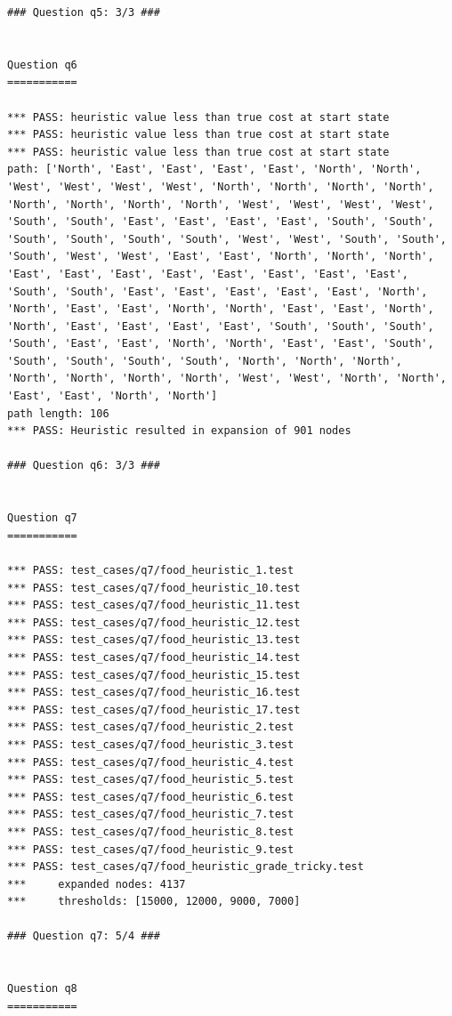 \documentclass{report}
\begin{document}
\begin{lstlisting}
### Question q5: 3/3 ###


Question q6
===========

*** PASS: heuristic value less than true cost at start state
*** PASS: heuristic value less than true cost at start state
*** PASS: heuristic value less than true cost at start state
path: ['North', 'East', 'East', 'East', 'East', 'North', 'North', 'West', 'West', 'West', 'West', 'North', 'North', 'North', 'North', 'North', 'North', 'North', 'North', 'West', 'West', 'West', 'West', 'South', 'South', 'East', 'East', 'East', 'East', 'South', 'South', 'South', 'South', 'South', 'South', 'West', 'West', 'South', 'South', 'South', 'West', 'West', 'East', 'East', 'North', 'North', 'North', 'East', 'East', 'East', 'East', 'East', 'East', 'East', 'East', 'South', 'South', 'East', 'East', 'East', 'East', 'East', 'North', 'North', 'East', 'East', 'North', 'North', 'East', 'East', 'North', 'North', 'East', 'East', 'East', 'East', 'South', 'South', 'South', 'South', 'East', 'East', 'North', 'North', 'East', 'East', 'South', 'South', 'South', 'South', 'South', 'North', 'North', 'North', 'North', 'North', 'North', 'North', 'West', 'West', 'North', 'North', 'East', 'East', 'North', 'North']
path length: 106
*** PASS: Heuristic resulted in expansion of 901 nodes

### Question q6: 3/3 ###


Question q7
===========

*** PASS: test_cases/q7/food_heuristic_1.test
*** PASS: test_cases/q7/food_heuristic_10.test
*** PASS: test_cases/q7/food_heuristic_11.test
*** PASS: test_cases/q7/food_heuristic_12.test
*** PASS: test_cases/q7/food_heuristic_13.test
*** PASS: test_cases/q7/food_heuristic_14.test
*** PASS: test_cases/q7/food_heuristic_15.test
*** PASS: test_cases/q7/food_heuristic_16.test
*** PASS: test_cases/q7/food_heuristic_17.test
*** PASS: test_cases/q7/food_heuristic_2.test
*** PASS: test_cases/q7/food_heuristic_3.test
*** PASS: test_cases/q7/food_heuristic_4.test
*** PASS: test_cases/q7/food_heuristic_5.test
*** PASS: test_cases/q7/food_heuristic_6.test
*** PASS: test_cases/q7/food_heuristic_7.test
*** PASS: test_cases/q7/food_heuristic_8.test
*** PASS: test_cases/q7/food_heuristic_9.test
*** PASS: test_cases/q7/food_heuristic_grade_tricky.test
*** 	expanded nodes: 4137
*** 	thresholds: [15000, 12000, 9000, 7000]

### Question q7: 5/4 ###


Question q8
===========


\end{lstlisting}
\end{document}
